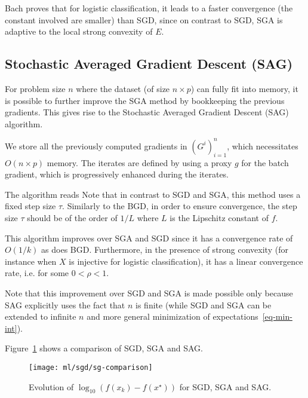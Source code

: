 
Bach proves that for logistic classification, 
it leads to a faster convergence (the constant involved are
smaller) than SGD, since 
on contrast to SGD, SGA is adaptive to the local strong convexity of $E$.



\subsection{Stochastic Averaged Gradient Descent (SAG)}

For problem size $n$ where the dataset (of size $n \times p$) can
fully fit into memory, it is possible to further improve the SGA method
by bookkeeping the previous gradients. This gives rise to the 
Stochastic Averaged Gradient Descent (SAG) algorithm.

We store all the previously computed gradients in $(G^i)_{i=1}^n$,
which necessitates $O(n \times p)$ memory. 
The iterates are defined by using a proxy $g$ for the batch gradient,
which is progressively enhanced during the iterates.

The algorithm reads
Note that in contrast to SGD and SGA, this method uses a fixed step
size $\tau$. Similarly to the BGD, in order to ensure convergence, 
the step size $\tau$ should be of the order of $1/L$
where $L$ is the Lipschitz constant of $f$.

This algorithm improves over SGA and SGD
since it has a convergence rate of $O(1/k)$ as does BGD. 
Furthermore, in the presence of strong convexity (for instance when $X$ is
injective for logistic classification), it has a linear convergence rate, 
i.e. 
for some $0 < \rho < 1$. 

Note that this improvement over SGD and SGA is made possible only because
SAG explicitly uses the fact that $n$ is finite (while SGD and SGA can
be extended to infinite $n$ and more general minimization of
expectations~\eqref{eq-min-int}).

Figure~\ref{fig-bgd} shows a comparison of SGD, SGA and SAG.

\begin{figure}
\centering
\texttt{[image: ml/sgd/sg-comparison]}
\caption{\label{fig-bgd}
Evolution of $\log_{10}(f(x_k)-f(x^\star))$ for SGD, SGA and SAG.
}
\end{figure}




